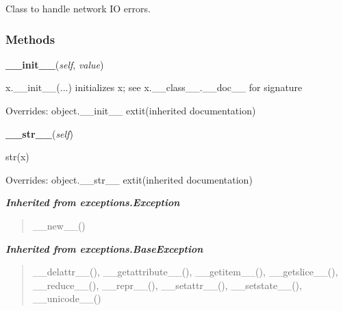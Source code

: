 Class to handle network IO errors.



  \subsubsection{Methods}

    \vspace{0.5ex}

\hspace{.8\funcindent}\begin{boxedminipage}{\funcwidth}

    \raggedright \textbf{\_\_init\_\_}(\textit{self}, \textit{value})

\setlength{\parskip}{2ex}
    x.\_\_init\_\_(...) initializes x; see x.\_\_class\_\_.\_\_doc\_\_ for 
    signature

\setlength{\parskip}{1ex}
      Overrides: object.\_\_init\_\_ 	extit{(inherited documentation)}

    \end{boxedminipage}

    \vspace{0.5ex}

\hspace{.8\funcindent}\begin{boxedminipage}{\funcwidth}

    \raggedright \textbf{\_\_str\_\_}(\textit{self})

\setlength{\parskip}{2ex}
    str(x)

\setlength{\parskip}{1ex}
      Overrides: object.\_\_str\_\_ 	extit{(inherited documentation)}

    \end{boxedminipage}


\large{\textbf{\textit{Inherited from exceptions.Exception}}}

\begin{quote}
\_\_new\_\_()
\end{quote}

\large{\textbf{\textit{Inherited from exceptions.BaseException}}}

\begin{quote}
\_\_delattr\_\_(), \_\_getattribute\_\_(), \_\_getitem\_\_(), \_\_getslice\_\_(), \_\_reduce\_\_(), \_\_repr\_\_(), \_\_setattr\_\_(), \_\_setstate\_\_(), \_\_unicode\_\_()
\end{quote}

